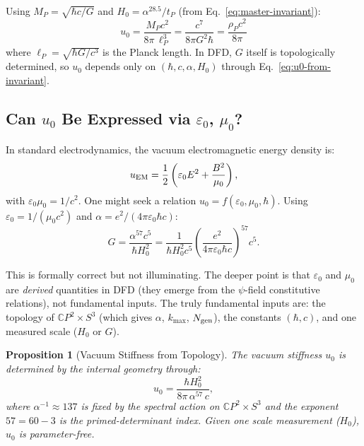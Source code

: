 \documentclass[11pt]{article}
\newcommand{\CP}{\mathbb{C}P}
\theoremstyle{plain}
\newtheorem{proposition}{Proposition}
\theoremstyle{definition}
\theoremstyle{remark}
\begin{document}
Using $M_P = \sqrt{\hbar c/G}$ and $H_0 = \alpha^{28.5}/t_P$
(from Eq.~\eqref{eq:master-invariant}):
\begin{equation}
\boxed{u_0 = \frac{M_P c^2}{8\pi\,\ell_P^3} = \frac{c^7}{8\pi G^2\hbar}
= \frac{\rho_P c^2}{8\pi}}
\label{eq:u0-planck}
\end{equation}
where $\ell_P = \sqrt{\hbar G/c^3}$ is the Planck length. In DFD, $G$
itself is topologically determined, so $u_0$ depends only on
$(\hbar, c, \alpha, H_0)$ through Eq.~\eqref{eq:u0-from-invariant}.

\subsection{Can $u_0$ Be Expressed via $\varepsilon_0$, $\mu_0$?}

In standard electrodynamics, the vacuum electromagnetic energy density is:
\begin{equation}
u_{\rm EM} = \frac{1}{2}\left(\varepsilon_0 E^2 + \frac{B^2}{\mu_0}\right),
\end{equation}
with $\varepsilon_0\mu_0 = 1/c^2$. One might seek a relation
$u_0 = f(\varepsilon_0, \mu_0, \hbar)$. Using $\varepsilon_0 = 1/(\mu_0 c^2)$
and $\alpha = e^2/(4\pi\varepsilon_0\hbar c)$:
\begin{equation}
G = \frac{\alpha^{57} c^5}{\hbar H_0^2}
= \frac{1}{\hbar H_0^2 c^5}
\left(\frac{e^2}{4\pi\varepsilon_0\hbar c}\right)^{57} c^{5}.
\end{equation}

This is formally correct but not illuminating. The deeper point is that
$\varepsilon_0$ and $\mu_0$ are \emph{derived} quantities in DFD (they
emerge from the $\psi$-field constitutive relations), not fundamental inputs.
The truly fundamental inputs are: the topology of $\CP^2 \times S^3$
(which gives $\alpha$, $k_{\max}$, $N_{\rm gen}$), the constants
$(\hbar, c)$, and one measured scale ($H_0$ or $G$).

\begin{proposition}[Vacuum Stiffness from Topology]
\label{prop:u0-topology}
The vacuum stiffness $u_0$ is determined by the internal geometry through:
\begin{equation}
u_0 = \frac{\hbar H_0^2}{8\pi\,\alpha^{57}\,c},
\end{equation}
where $\alpha^{-1} \approx 137$ is fixed by the spectral action on
$\CP^2 \times S^3$ and the exponent $57 = 60 - 3$ is the primed-determinant
index. Given one scale measurement ($H_0$), $u_0$ is parameter-free.
\end{proposition}
\end{document}
